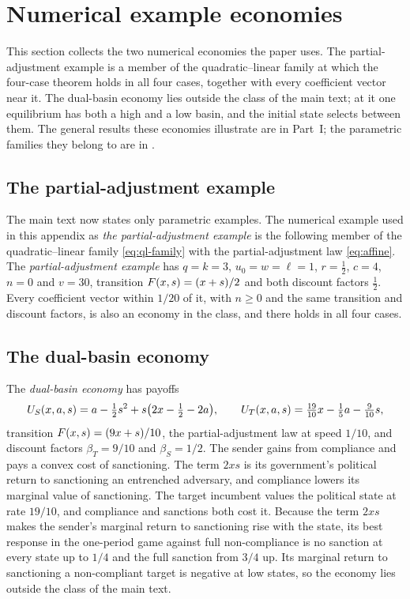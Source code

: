 \section{Numerical example economies}
\label{app:numerical-examples}

This section collects the two numerical economies the paper uses. The
partial-adjustment example is a member of the quadratic--linear family at which the
four-case theorem holds in all four cases, together with every coefficient vector near
it. The dual-basin economy lies outside the class of the main text; at it one
equilibrium has both a high and a low basin, and the initial state selects between
them. The general results these economies illustrate are in Part~I; the parametric
families they belong to are in .

\subsection{The partial-adjustment example}
\label{sec:moved-main-2026-10-15}

The main text now states only parametric examples. The numerical example used in
this appendix as \emph{the partial-adjustment example} is the following member of
the quadratic--linear family \eqref{eq:ql-family} with the partial-adjustment law
\eqref{eq:affine}.
The \emph{partial-adjustment example} has $q=k=3$, $u_0=w=\ell=1$,
$r=\tfrac12$, $c=4$, $n=0$ and $v=30$, transition $F(x,s)=(x+s)/2$ and both
discount factors $\tfrac12$. Every coefficient
vector within $1/20$ of it, with $n\ge0$ and the same transition and discount
factors, is also an economy in the class, and there  holds in all four cases.

\subsection{The dual-basin economy}
\label{app:dual-basin-economy}

 The \emph{dual-basin economy} has payoffs
\[
U_S(x,a,s)=a-\tfrac12s^2+s\bigl(2x-\tfrac12-2a\bigr),\qquad
U_T(x,a,s)=\tfrac{19}{10}x-\tfrac15a-\tfrac{9}{10}s,
\]
transition $F(x,s)=(9x+s)/10$, the partial-adjustment law at speed $1/10$, and
discount factors $\beta_T=9/10$ and $\beta_S=1/2$. The sender gains from
compliance and pays a convex cost of sanctioning. The term $2xs$ is its
government's political return to sanctioning an entrenched adversary, and
compliance lowers its marginal value of sanctioning. The target incumbent values
the political state at rate $19/10$, and compliance and sanctions both cost it.
Because the term $2xs$ makes the sender's marginal return to sanctioning rise with
the state, its best response in the one-period game against full non-compliance is no
sanction at every state up to $1/4$ and the full sanction from $3/4$ up. Its
marginal return to sanctioning a non-compliant target is negative at low states, so the
economy lies outside the class of the main text.

